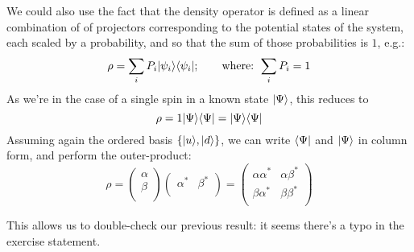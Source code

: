 \documentclass[solutions.tex]{subfiles}
\begin{document}
\begin{remark} We could also use the fact that the density operator is
defined as a linear combination of of projectors corresponding to the
potential states of the system, each scaled by a probability, and so that
the sum of those probabilities is $1$, e.g.:
\[
	\rho = \sum_iP_i|\psi_i\rangle\langle \psi_i|;\qquad\text{where: }
	\sum_iP_i = 1
\]
As we're in the case of a single spin in a known state $|\Psi\rangle$, this
reduces to
\[
	\rho = 1|\Psi\rangle\langle \Psi| = |\Psi\rangle\langle \Psi|
\]
Assuming again the ordered basis $\{|u\rangle, |d\rangle\}$, we can
write $\langle \Psi|$ and $|\Psi\rangle$ in column form, and perform
the outer-product:
\[
	\rho = \begin{pmatrix}
		\alpha \\
		\beta \\
	\end{pmatrix}\begin{pmatrix} \alpha^* & \beta^* \\ \end{pmatrix}
	= \begin{pmatrix}
		\alpha\alpha^* & \alpha\beta^* \\
		\beta\alpha^* & \beta\beta^* \\
	\end{pmatrix}
\]
\end{remark}

This allows us to double-check our previous result: it seems there's a typo
in the exercise statement.

\hrr
\end{document}
